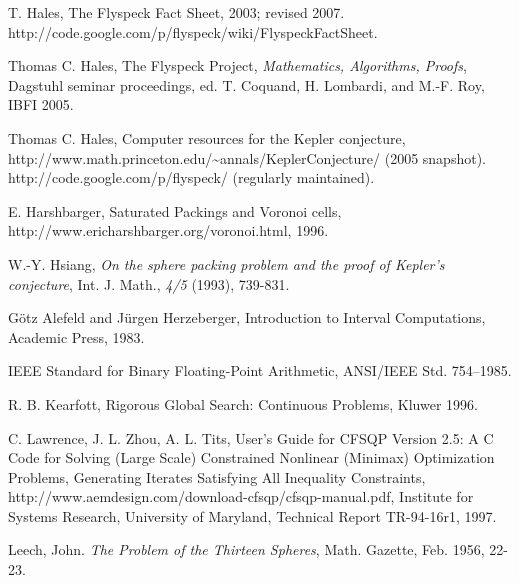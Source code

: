 \documentclass{llncs}
\begin{document}
\begin{thebibliography}{HeHa94}
	   T. Hales, The Flyspeck Fact Sheet, 2003; revised
2007. http://code.google.com/p/flyspeck/wiki/FlyspeckFactSheet.
	
	  Thomas C. Hales, The Flyspeck Project, 
{\it Mathematics, Algorithms, Proofs}, Dagstuhl seminar proceedings, 
ed. T. Coquand, H. Lombardi, and M.-F. Roy,
IBFI 2005.
	






 Thomas C. Hales, Computer resources for the Kepler conjecture, \hfill\break
    http://www.math.princeton.edu/\~\!annals/KeplerConjecture/ (2005 snapshot).
    http://code.google.com/p/flyspeck/ (regularly maintained).
    
 E. Harshbarger, Saturated Packings and Voronoi cells, http://www.ericharshbarger.org/voronoi.html, 1996.

 W.-Y. Hsiang, {\it On the sphere packing problem and
the proof of Kepler's conjecture}, Int. J. Math., \emph{4/5} (1993),
739-831.

 G\"otz Alefeld and J\"urgen Herzeberger,
Introduction to Interval Computations, Academic Press, 1983.


 IEEE Standard for Binary Floating-Point Arithmetic,
ANSI/IEEE Std. 754--1985.

 R. B. Kearfott, Rigorous Global Search: Continuous
Problems, Kluwer 1996.

 C. Lawrence, J. L. Zhou, A. L. Tits,  User's Guide for CFSQP Version 2.5:
   A C Code for Solving (Large Scale) Constrained Nonlinear (Minimax) Optimization Problems, Generating
   Iterates Satisfying All Inequality Constraints, 
   http://www.aemdesign.com/download-cfsqp/cfsqp-manual.pdf, 
   Institute for Systems Research, University of Maryland, Technical Report TR-94-16r1, 1997.


 Leech, John.  {\it The Problem of the Thirteen
Spheres}, Math. Gazette, Feb. 1956, 22-23.


\end{thebibliography}
\end{document}
